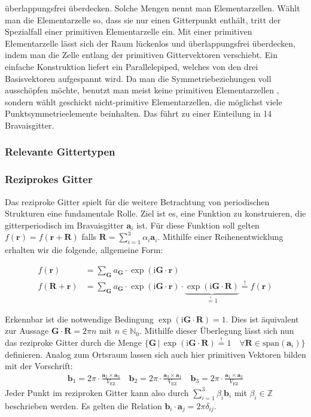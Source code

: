 überlappungsfrei überdecken. Solche Mengen nennt man Elementarzellen. Wählt man die Elementarzelle so, dass sie 
nur einen 
Gitterpunkt enthält, tritt der Spezialfall einer primitiven Elementarzelle ein. Mit einer primitiven Elementarzelle 
lässt sich der Raum lückenlos und überlappungsfrei überdecken, indem man die Zelle entlang der primitiven Gittervektoren 
verschiebt. Ein einfache Konstruktion liefert ein Parallelepiped, welches von den drei Basisvektoren aufgespannt wird. 
\autocite[90-91]{Ashcroft}  Da man die Symmetriebeziehungen voll ausschöpfen möchte, benutzt man meist keine primitiven Elementarzellen
, sondern wählt geschickt nicht-primitive Elementarzellen, die möglichst viele Punktsymmetrieelemente beinhalten. 
Das führt zu einer Einteilung in 14 Bravaisgitter. \autocite[51]{Hunklinger}
\subsubsection{Relevante Gittertypen}
\subsubsection{Reziprokes Gitter}
Das reziproke Gitter spielt für die weitere Betrachtung von periodischen Strukturen eine fundamentale Rolle. Ziel 
ist es, eine Funktion zu konstruieren, die gitterperiodisch im Bravaisgitter $\mathbf{a}_{i}$ ist. Für diese Funktion
soll gelten $f(\mathbf{r})=f(\mathbf{r}+\mathbf{R})$ falls $\mathbf{R}=\sum_{i=1}^{3} \alpha_{i}\mathbf{a}_{i}$. 
Mithilfe einer Reihenentwicklung erhalten wir die folgende, allgemeine Form:

\begin{align*}
	f(\mathbf{r})&=\sum_{\mathbf{G}}a_{\mathbf{G}}\cdot \exp(\mathrm{i}\mathbf{G}\cdot\mathbf{r}) \\
	f(\mathbf{R}+\mathbf{r})&=\sum_{\mathbf{G}}a_{\mathbf{G}}\cdot \exp(\mathrm{i}\mathbf{G}\cdot \mathbf{r})\cdot
	\underbrace{ \exp(\mathrm{i}\mathbf{G}\cdot \mathbf{R}) }_{ \stackrel{!}{=}1 }  \stackrel{!}{=} f(\mathbf{r})
\end{align*}

Erkennbar ist die notwendige Bedingung $\exp(\mathrm{i}\mathbf{G}\cdot \mathbf{R})=1$. Dies ist äquivalent zur 
Aussage $\mathbf{G}\cdot \mathbf{R}=2\pi n$ mit $n \in \mathbb{N}_{0}$. Mithilfe dieser Überlegung lässt sich nun 
das reziproke Gitter durch die Menge $\{ \mathbf{G} \,\vert\, \exp(\mathrm{i}\mathbf{G}\cdot \mathbf{R}) \stackrel{!}{=}1 \quad \forall \mathbf{R} \in \text{span}(\mathbf{a}_{i}) \}$ definieren. \autocite[108]{Ashcroft} Analog zum Ortsraum lassen sich auch hier primitiven Vektoren bilden mit der Vorschrift: 
\begin{align*}
	\mathbf{b}_{1} = 2\pi \cdot \frac{\mathbf{a}_{2} \times \mathbf{a}_{3}}{V_{\mathrm{EZ}}} \quad
	\mathbf{b}_{2} = 2\pi \cdot \frac{\mathbf{a}_{3} \times \mathbf{a}_{1}}{V_{\mathrm{EZ}}} \quad
	\mathbf{b}_{3} = 2\pi \cdot \frac{\mathbf{a}_{1} \times \mathbf{a}_{2}}{V_{\mathrm{EZ}}}
\end{align*}
Jeder Punkt im reziproken Gitter kann also durch $\sum_{i=1}^{3} \beta_{i}\mathbf{b}_{i}$ mit $\beta_i \in \mathbb{Z}
$ beschrieben werden. Es gelten die Relation $\mathbf{b}_{i}\cdot \mathbf{a}_{j}=2 \pi \delta_{ij}$. 
\autocite[109]{Ashcroft}

